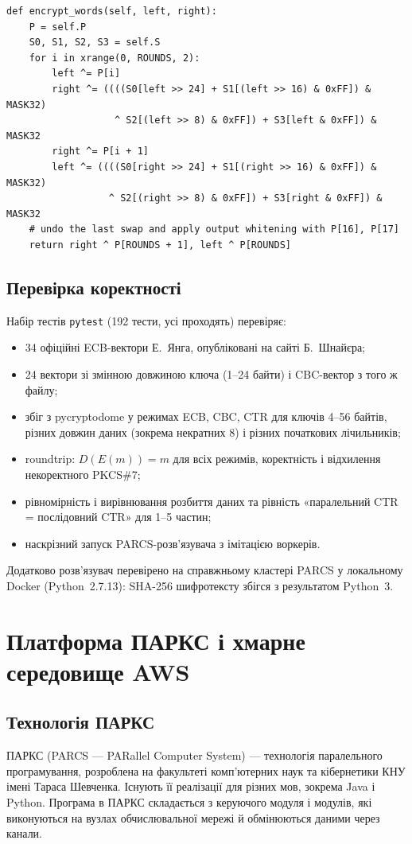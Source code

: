 \documentclass[a4paper,12pt]{article}
\begin{document}
\begin{lstlisting}[caption={Шифрування одного блоку (два раунди Фейстеля за ітерацію)},label={lst:encrypt}]
def encrypt_words(self, left, right):
    P = self.P
    S0, S1, S2, S3 = self.S
    for i in xrange(0, ROUNDS, 2):
        left ^= P[i]
        right ^= ((((S0[left >> 24] + S1[(left >> 16) & 0xFF]) & MASK32)
                   ^ S2[(left >> 8) & 0xFF]) + S3[left & 0xFF]) & MASK32
        right ^= P[i + 1]
        left ^= ((((S0[right >> 24] + S1[(right >> 16) & 0xFF]) & MASK32)
                  ^ S2[(right >> 8) & 0xFF]) + S3[right & 0xFF]) & MASK32
    # undo the last swap and apply output whitening with P[16], P[17]
    return right ^ P[ROUNDS + 1], left ^ P[ROUNDS]
\end{lstlisting}

\subsection{Перевірка коректності}
Набір тестів \texttt{pytest} (192 тести, усі проходять) перевіряє:
\begin{itemize}
  \item 34 офіційні ECB-вектори Е.~Янга, опубліковані на сайті Б.~Шнайєра;
  \item 24 вектори зі змінною довжиною ключа (1--24 байти) і CBC-вектор з того ж файлу;
  \item збіг з pycryptodome у режимах ECB, CBC, CTR для ключів 4--56 байтів, різних довжин даних
        (зокрема некратних 8) і різних початкових лічильників;
  \item roundtrip: $D(E(m)) = m$ для всіх режимів, коректність і відхилення некоректного PKCS\#7;
  \item рівномірність і вирівнювання розбиття даних та рівність
        «паралельний CTR = послідовний CTR» для 1--5 частин;
  \item наскрізний запуск PARCS-розв'язувача з імітацією воркерів.
\end{itemize}
Додатково розв'язувач перевірено на справжньому кластері PARCS у локальному Docker
(Python~2.7.13): SHA-256 шифротексту збігся з результатом Python~3.

\section{Платформа ПАРКС і хмарне середовище AWS}
\subsection{Технологія ПАРКС}
ПАРКС (PARCS --- PARallel Computer System) --- технологія паралельного
програмування, розроблена на факультеті комп'ютерних наук та кібернетики КНУ
імені Тараса Шевченка. Існують її реалізації для різних мов, зокрема Java
і Python. Програма в ПАРКС
складається з керуючого модуля і модулів, які виконуються на вузлах обчислювальної
мережі й обмінюються даними через канали.
\end{document}

